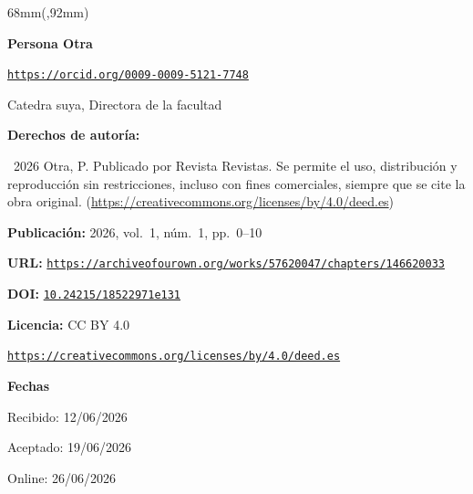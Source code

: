 \documentclass{article}
\newlength{\gbbloquex}
\begin{document}
\begin{textblock*}{68mm}(\gbbloquex,92mm)
{\setlength{\leftskip}{0pt}\setlength{\parindent}{0pt}%
\noindent\begin{minipage}[t]{68mm}
\sffamily\small\setlength{\parskip}{1pt}
{\bfseries\color{azulrevista}Persona Otra}\par
{\scriptsize\texttt{\href{https://orcid.org/0009-0009-5121-7748}{https://orcid.org/0009-0009-5121-7748}}}\par
Catedra suya, Directora de la facultad\par
\vspace{6pt}
{\bfseries\color{azulrevista!70}Derechos de autor\'ia:}\par
\textcopyright\ 2026 Otra, P. Publicado por Revista Revistas. Se permite el uso, distribución y reproducción sin restricciones, incluso con fines comerciales, siempre que se cite la obra original. (\href{https://creativecommons.org/licenses/by/4.0/deed.es}{https://creativecommons.org/licenses/by/4.0/deed.es})\par\vspace{6pt}
{\bfseries\color{azulrevista!70}Publicación:} 2026, vol.~1, n\'um.~1, pp.~0--10\par\vspace{6pt}
{\bfseries\color{azulrevista!70}URL:} {\scriptsize\texttt{\href{https://archiveofourown.org/works/57620047/chapters/146620033}{https://archiveofourown.org/works/57620047/chapters/146620033}}}\par\vspace{6pt}
{\bfseries\color{azulrevista!70}DOI:} {\scriptsize\texttt{\href{https://doi.org/10.24215/18522971e131}{10.24215/18522971e131}}}\par\vspace{6pt}
{\bfseries\color{azulrevista!70}Licencia:} CC BY 4.0\par
{\scriptsize\texttt{\href{https://creativecommons.org/licenses/by/4.0/deed.es}{https://creativecommons.org/licenses/by/4.0/deed.es}}}\par
\vspace{6pt}
{\bfseries\color{azulrevista!70}Fechas}\par\vspace{2pt}
Recibido: 12/06/2026\par
Aceptado: 19/06/2026\par
Online: 26/06/2026\par
\vspace{6pt}
\vspace{6pt}

\end{minipage}}
\end{textblock*}
\end{document}
